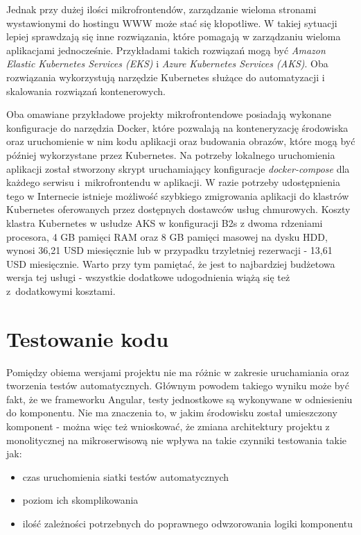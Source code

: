 \documentclass{SGGW-thesis}
\begin{document}
  Jednak przy dużej ilości mikrofrontendów, zarządzanie wieloma stronami wystawionymi do hostingu WWW może stać się kłopotliwe. W takiej sytuacji lepiej sprawdzają się inne rozwiązania, które pomagają w zarządzaniu wieloma aplikacjami jednocześnie. Przykładami takich rozwiązań mogą być \textit{Amazon Elastic Kubernetes Services (EKS)} i \textit{Azure Kubernetes Services (AKS)}. Oba rozwiązania wykorzystują narzędzie Kubernetes \cite{kubernetes} służące do automatyzacji i skalowania rozwiązań kontenerowych.

  Oba omawiane przykładowe projekty mikrofrontendowe posiadają wykonane konfiguracje do narzędzia Docker, które pozwalają na konteneryzację środowiska oraz uruchomienie w nim kodu aplikacji oraz budowania obrazów, które mogą być później wykorzystane przez Kubernetes. Na potrzeby lokalnego uruchomienia aplikacji został stworzony skrypt uruchamiający konfiguracje \textit{docker-compose} dla każdego serwisu i~mikrofrontendu w aplikacji. W razie potrzeby udostępnienia tego w Internecie istnieje możliwość szybkiego zmigrowania aplikacji do klastrów Kubernetes oferowanych przez dostępnych dostawców usług chmurowych. Koszty klastra Kubernetes w usłudze AKS \cite{aks_calc} w konfiguracji B2s z dwoma rdzeniami procesora, 4 GB pamięci RAM oraz 8 GB pamięci masowej na dysku HDD, wynosi 36,21 USD miesięcznie lub w przypadku trzyletniej rezerwacji - 13,61 USD miesięcznie. Warto przy tym pamiętać, że jest to najbardziej budżetowa wersja tej usługi - wszystkie dodatkowe udogodnienia wiążą się też z~dodatkowymi kosztami.

  \section{Testowanie kodu}
  Pomiędzy obiema wersjami projektu nie ma różnic w zakresie uruchamiania oraz tworzenia testów automatycznych. Głównym powodem takiego wyniku może być fakt, że we frameworku Angular, testy jednostkowe są wykonywane w odniesieniu do komponentu. Nie ma znaczenia to, w jakim środowisku został umieszczony komponent - można więc też wnioskować, że zmiana architektury projektu z monolitycznej na mikroserwisową nie wpływa na takie czynniki testowania takie jak:
  
  \begin{itemize}
    \item czas uruchomienia siatki testów automatycznych
    \item poziom ich skomplikowania
    \item ilość zależności potrzebnych do poprawnego odwzorowania logiki komponentu
  \end{itemize}
\end{document}
